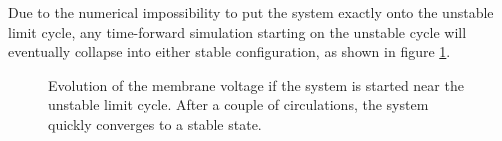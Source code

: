 \documentclass[12pt,a4paper]{article}
\begin{document}
Due to the numerical impossibility to put the system exactly onto the unstable limit cycle, any time-forward simulation starting on the unstable cycle will eventually collapse into either stable configuration, as shown in figure \ref{divergent}.
\begin{figure}[H]
	\caption{Evolution of the membrane voltage if the system is started near the unstable limit cycle. After a couple of circulations, the system quickly converges to a stable state.}
	\label{divergent} 
\end{figure}
\end{document}
